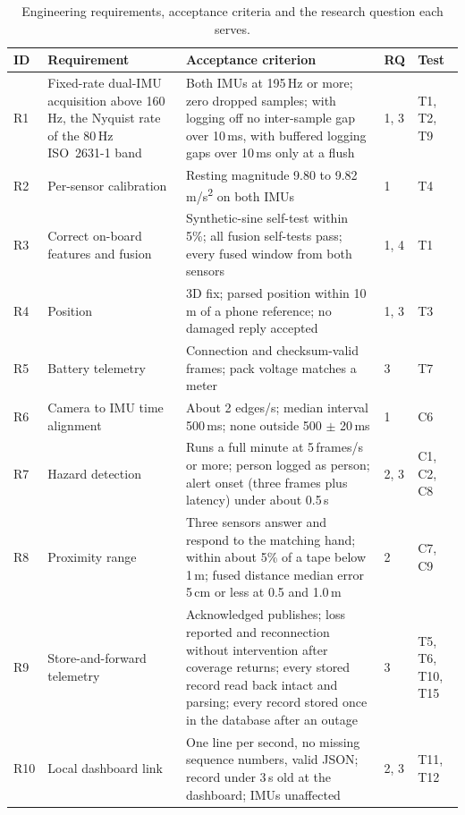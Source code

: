 \begin{table}[htbp]
\centering
\footnotesize
\caption[Engineering requirements, acceptance criteria and the research question each serves]{Engineering requirements, acceptance criteria and the research question each serves.}
\label{tab:requirements-mapping}
\begin{tabular}{|p{0.7cm}|p{4.1cm}|p{6.3cm}|p{0.8cm}|p{1.7cm}|}
\hline
\textbf{ID} & \textbf{Requirement} & \textbf{Acceptance criterion} & \textbf{RQ} & \textbf{Test} \\ \hline
R1 & Fixed-rate dual-IMU acquisition above 160\,Hz, the Nyquist rate of the 80\,Hz ISO~2631-1 band & Both IMUs at 195\,Hz or more; zero dropped samples; with logging off no inter-sample gap over 10\,ms, with buffered logging gaps over 10\,ms only at a flush & 1, 3 & T1, T2, T9 \\ \hline
R2 & Per-sensor calibration & Resting magnitude 9.80 to 9.82\,m/s\textsuperscript{2} on both IMUs & 1 & T4 \\ \hline
R3 & Correct on-board features and fusion & Synthetic-sine self-test within 5\%; all fusion self-tests pass; every fused window from both sensors & 1, 4 & T1 \\ \hline
R4 & Position & 3D fix; parsed position within 10\,m of a phone reference; no damaged reply accepted & 1, 3 & T3 \\ \hline
R5 & Battery telemetry & Connection and checksum-valid frames; pack voltage matches a meter & 3 & T7 \\ \hline
R6 & Camera to IMU time alignment & About 2 edges/s; median interval 500\,ms; none outside 500 $\pm$ 20\,ms & 1 & C6 \\ \hline
R7 & Hazard detection & Runs a full minute at 5\,frames/s or more; person logged as person; alert onset (three frames plus latency) under about 0.5\,s & 2, 3 & C1, C2, C8 \\ \hline
R8 & Proximity range & Three sensors answer and respond to the matching hand; within about 5\% of a tape below 1\,m; fused distance median error 5\,cm or less at 0.5 and 1.0\,m & 2 & C7, C9 \\ \hline
R9 & Store-and-forward telemetry & Acknowledged publishes; loss reported and reconnection without intervention after coverage returns; every stored record read back intact and parsing; every record stored once in the database after an outage & 3 & T5, T6, T10, T15 \\ \hline
R10 & Local dashboard link & One line per second, no missing sequence numbers, valid JSON; record under 3\,s old at the dashboard; IMUs unaffected & 2, 3 & T11, T12 \\ \hline

\end{tabular}
\end{table}
